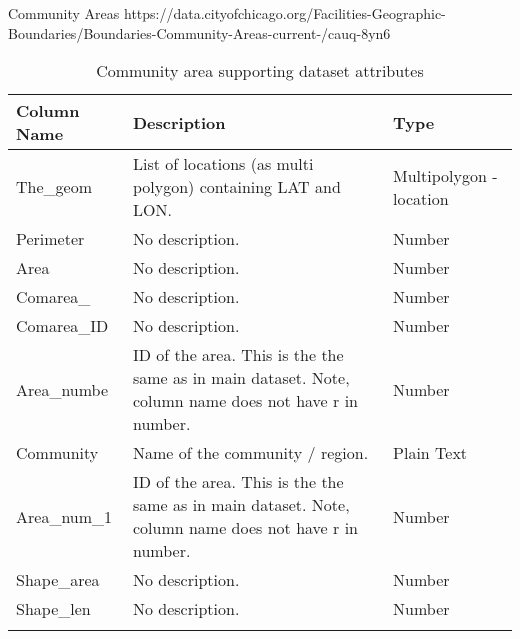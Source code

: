 Community Areas \newline
https://data.cityofchicago.org/Facilities-Geographic-Boundaries/Boundaries-Community-Areas-current-/cauq-8yn6
\begin{center}
\begin{longtable}{|m{6em}|m{18em}|m{7em}|}
    \hline
    Column Name & 
    Description & 
    Type\\
    \hline
    The\_geom & 
    List of locations (as multi polygon) containing LAT and LON. & 
    Multipolygon - location\\
    \hline
    Perimeter & 
    No description. & 
    Number\\
    \hline
    Area & 
    No description. & 
    Number\\
    \hline
    Comarea\_ & 
    No description. & 
    Number\\
    \hline
    Comarea\_ID & 
    No description. & 
    Number\\
    \hline
    Area\_numbe & 
    ID of the area. This is the the same as in main dataset. Note, column name does not have r in number. & 
    Number\\
    \hline
    Community & 
    Name of the community / region. & 
    Plain Text\\
    \hline
    Area\_num\_1 & 
    ID of the area. This is the the same as in main dataset. Note, column name does not have r in number. & 
    Number\\
    \hline
    Shape\_area & 
    No description. & 
    Number\\
    \hline
    Shape\_len & 
    No description. & 
    Number\\
    \hline
\caption{Community area supporting dataset attributes}
\end{longtable}
\end{center}


